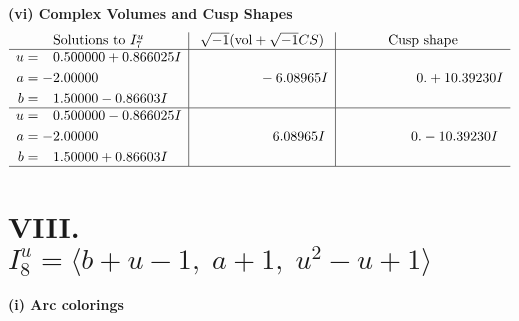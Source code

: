 \documentclass[1p]{elsarticle_modified}
\theoremstyle{definition}
\newcommand{\I}{\sqrt{-1}}
\begin{document}
\newpage\flushleft \textbf{(vi) Complex Volumes and Cusp Shapes}
$$\begin{array}{c|c|c}  
\text{Solutions to }I^u_{7}& \I (\text{vol} + \sqrt{-1}CS) & \text{Cusp shape}\\
 \hline 
\begin{aligned}
u &= \phantom{-}0.500000 + 0.866025 I \\
a &= -2.00000\phantom{ +0.000000I} \\
b &= \phantom{-}1.50000 - 0.86603 I\end{aligned}
 & \phantom{-0.000000 } -6.08965 I & \phantom{-0.000000 -}0. + 10.39230 I \\ \hline\begin{aligned}
u &= \phantom{-}0.500000 - 0.866025 I \\
a &= -2.00000\phantom{ +0.000000I} \\
b &= \phantom{-}1.50000 + 0.86603 I\end{aligned}
 & \phantom{-0.000000 -}6.08965 I & \phantom{-0.000000 } 0. - 10.39230 I\\
 \hline 
 \end{array}$$\newpage\newpage\renewcommand{\arraystretch}{1}
\centering \section*{VIII. $I^u_{8}= \langle b+u-1,\;a+1,\;u^2- u+1 \rangle$}
\flushleft \textbf{(i) Arc colorings}\\
\end{document}
